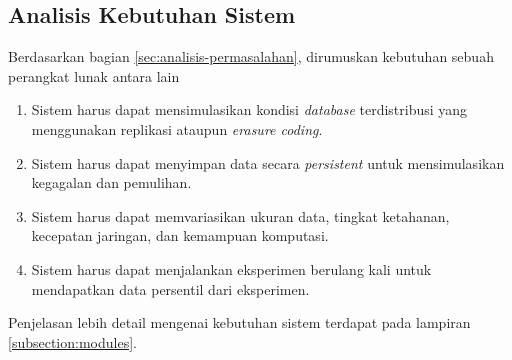\subsection{Analisis Kebutuhan Sistem}
\label{sec:analisis-kebutuhan-sistem}

Berdasarkan bagian \ref{sec:analisis-permasalahan}, dirumuskan kebutuhan sebuah perangkat lunak antara lain
\begin{enumerate}

    \item Sistem harus dapat mensimulasikan kondisi \textit{database} terdistribusi yang menggunakan replikasi ataupun \textit{erasure coding}.
    \item Sistem harus dapat menyimpan data secara \textit{persistent} untuk mensimulasikan kegagalan dan pemulihan.
    \item Sistem harus dapat memvariasikan ukuran data, tingkat ketahanan, kecepatan jaringan, dan kemampuan komputasi.
    \item Sistem harus dapat menjalankan eksperimen berulang kali untuk mendapatkan data persentil dari eksperimen.
    
\end{enumerate}

Penjelasan lebih detail mengenai kebutuhan sistem terdapat pada lampiran \ref{subsection:modules}.